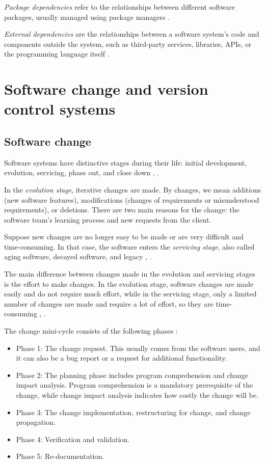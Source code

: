\textit{Package dependencies} refer to the relationships between different software packages, usually managed using package managers \cite{dep-package}.

\textit{External dependencies} are the relationships between a software system's code and components outside the system, such as third-party services, libraries, APIs, or the programming language itself \cite{dep-external}.






\section{Software change and version control systems}

\subsection{Software change}
\label{change}

\hspace{4em} Software systems have distinctive stages during their life: initial development, evolution, servicing, phase out, and close down \cite{Software-life-cycle}, \cite{model-bennett}.

In the \textit{evolution stage}, iterative changes are made. By changes, we mean additions (new software features), modifications (changes of requirements or misunderstood requirements), or deletions. There are two main reasons for the change: the software team's learning process and new requests from the client.

Suppose new changes are no longer easy to be made or are very difficult and time-consuming. In that case, the software enters the \textit{servicing stage}, also called aging software, decayed software, and legacy \cite{Software-life-cycle}, \cite{363157}.

The main difference between changes made in the evolution and servicing stages is the effort to make changes. In the evolution stage, software changes are made easily and do not require much effort, while in the servicing stage, only a limited number of changes are made and require a lot of effort, so they are time-consuming \cite{Bennett}, \cite{Rajlich}.

The change mini-cycle consists of the following phases \cite{810308}:
\begin{itemize}
\item Phase 1: The change request. This usually comes from the software users, and it can also be a bug report or a request for additional functionality.
\item Phase 2: The planning phase includes program comprehension and change impact analysis. Program comprehension is a mandatory prerequisite of the change, while change
impact analysis indicates how costly the change will be. \cite{Bohner}
\item Phase 3: The change implementation, restructuring for change, and change propagation.
\item Phase 4: Verification and validation.
\item Phase 5: Re-documentation.
\end{itemize}

